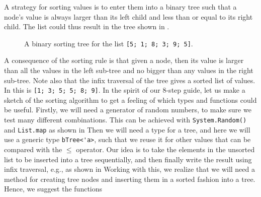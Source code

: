\documentclass[fsharpNotes.tex]{subfiles}
\begin{document}
A strategy for sorting values is to enter them into a binary tree such that a node's value is always larger than its left child and less than or equal to its right child. The list could thus result in the tree shown in .
\begin{figure}
  \begin{center}
  \end{center}
  \caption{A binary sorting tree for the list \lstinline{[5; 1; 8; 3; 9; 5]}.}
  \label{fig:sortedBTree}
\end{figure}
A consequence of the sorting rule is that given a node, then its value is larger than all the values in the left sub-tree and no bigger than any values in the right sub-tree. Note also that the infix traversal of the tree gives a sorted list of values. In  this is \lstinline{[1; 3; 5; 5; 8; 9]}. In the spirit of our 8-step guide, let us make a sketch of the sorting algorithm to get a feeling of which types and functions could be useful. Firstly, we will need a generator of random numbers, to make sure we test many different combinations. This can be achieved with \lstinline{System.Random()} and \lstinline{List.map} as shown in 
%
%
Then we will need a type for a tree, and here we will use a generic type \lstinline{bTree<'a>}, such that we reuse it for other values that can be compared with the $\le$ operator. Our idea is to take the elements in the unsorted list to be inserted into a tree sequentially, and then finally write the result using infix traversal, e.g., as shown in 
%
%
Working with this, we realize that we will need a method for creating tree nodes and inserting them in a sorted fashion into a tree. Hence, we suggest the functions
\end{document}
